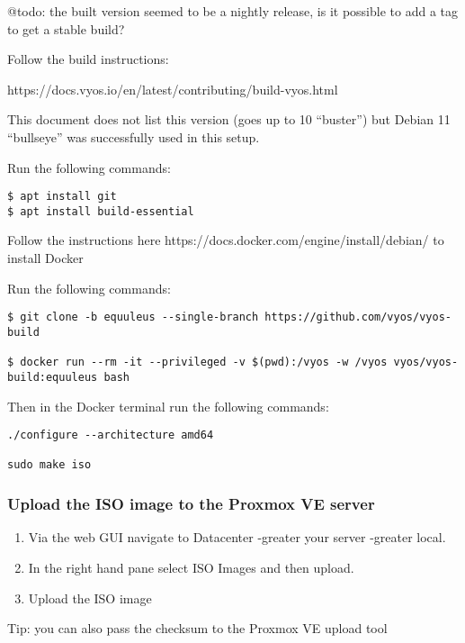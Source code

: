 @todo: the built version seemed to be a nightly release, is it possible
to add a tag to get a stable build?

Follow the build instructions:

https://docs.vyos.io/en/latest/contributing/build-vyos.html

This document does not list this version (goes up to 10 ``buster'') but
Debian 11 ``bullseye'' was successfully used in this setup.

Run the following commands:

\begin{verbatim}
$ apt install git
$ apt install build-essential
\end{verbatim}

Follow the instructions here
https://docs.docker.com/engine/install/debian/ to install Docker

Run the following commands:

\begin{verbatim}
$ git clone -b equuleus --single-branch https://github.com/vyos/vyos-build

$ docker run --rm -it --privileged -v $(pwd):/vyos -w /vyos vyos/vyos-build:equuleus bash
\end{verbatim}

Then in the Docker terminal run the following commands:

\begin{verbatim}
./configure --architecture amd64

sudo make iso
\end{verbatim}

\hypertarget{upload-the-iso-image-to-the-proxmox-ve-server}{%
\subsubsection{Upload the ISO image to the Proxmox VE
server}\label{upload-the-iso-image-to-the-proxmox-ve-server}}

\begin{enumerate}
\def\labelenumi{\arabic{enumi}.}
\item
  Via the web GUI navigate to Datacenter -greater{} your server
  -greater{} local.
\item
  In the right hand pane select ISO Images and then upload.
\item
  Upload the ISO image
\end{enumerate}

Tip: you can also pass the checksum to the Proxmox VE upload tool

